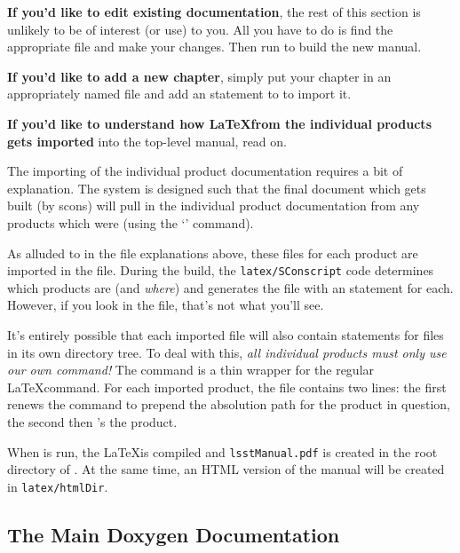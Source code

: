 {\bfseries If you'd like to edit existing documentation}, the rest of
this section is unlikely to be of interest (or use) to you.  All you
have to do is find the appropriate \tttex file and make your changes.
Then run \ttscons to build the new manual.

{\bfseries If you'd like to add a new chapter}, simply put your
chapter in an appropriately named \tttex file and add an \ttinput
statement to \ttlsstmanual to import it.

{\bfseries If you'd like to understand how \LaTeX from the individual
  products gets imported} into the top-level manual, read on.

The importing of the individual product documentation requires a bit
of explanation.  The system is designed such that the final document
which gets built (by scons) will pull in the individual product
documentation from any products which were \ttsetup (using the
\tteups `\ttsetup' command).

As alluded to in the file explanations above, these \tttex files for
each product are imported in the \ttlsstpackages file.
During the build, the \texttt{latex/SConscript} code determines which
products are \ttsetup (and {\itshape where}) and generates the
\ttlsstpackages file with an \ttinput statement for each.  However, if
you look in the \ttlsstpackages file, that's not what you'll see.

It's entirely possible that each imported \tttex file will also
contain \ttinput statements for files in its own directory tree.  To
deal with this, {\itshape all individual products must only use our
  own \ttlsstinput command!}  The \ttlsstinput command is a thin
wrapper for the regular \LaTeX \ttinput command.  For each imported
product, the \ttlsstpackages file contains two lines: the first renews
the \ttlsstinput command to prepend the absolution path for the
product in question, the second then \ttlsstinput's the product.

When \ttscons is run, the \LaTeX is compiled and
\texttt{lsstManual.pdf} is created in the root directory of
\ttdevenvdoc.  At the same time, an HTML version of the manual will be
created in \texttt{latex/htmlDir}.

\iffalse
%
%
\subsection{The Main Doxygen Documentation\label{sec-maindoxygen}}

